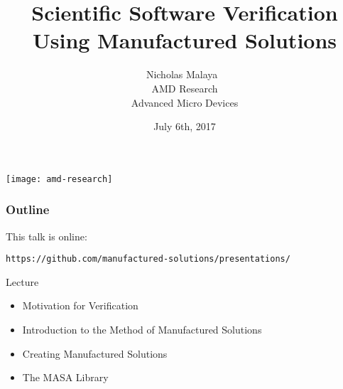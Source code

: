 \documentclass[mathserif]{beamer}
\date{July 6th, 2017}
\author[Nicholas Malaya]{Nicholas Malaya
$~$ \\
{\small
AMD Research \\
Advanced Micro Devices}
}
\title[Software Verification]{Scientific Software Verification\\
Using Manufactured Solutions}
\begin{document}
\renewcommand{\inserttotalframenumber}{53}

\begin{frame}
  \titlepage
  \begin{flushright}
    \texttt{[image: amd-research]}\\
  \end{flushright}
\end{frame}

\begin{frame}[fragile]
  \frametitle{Outline}

  This talk is online:
\begin{verbatim}https://github.com/manufactured-solutions/presentations/\end{verbatim}
  
  \begin{block}{Lecture}
    \begin{itemize}
    \item Motivation for Verification
    \item Introduction to the Method of Manufactured Solutions
    \item Creating Manufactured Solutions
    \item The MASA Library
    \end{itemize}
  \end{block}


\end{frame}
\end{document}
